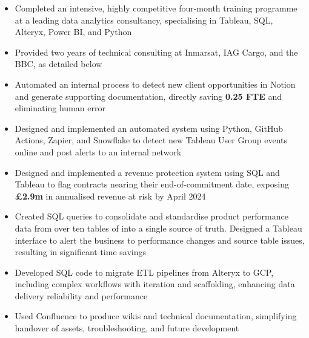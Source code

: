 \begin{paracol}{2}

\begin{itemize}
\item Completed an intensive, highly competitive four-month training programme at a leading data analytics consultancy, specialising in Tableau, SQL, Alteryx, Power BI, and Python
\item Provided two years of technical consulting at Inmarsat, IAG Cargo, and the BBC, as detailed below
\item Automated an internal process to detect new client opportunities in Notion and generate supporting documentation, directly saving \textbf{0.25 FTE} and eliminating human error
\item Designed and implemented an automated system using Python, GitHub Actions, Zapier, and Snowflake to detect new Tableau User Group events online and post alerts to an internal network

\medskip
{}

\end{itemize}

\divider


\begin{itemize}
\item Designed and implemented a revenue protection system using SQL and Tableau to flag contracts nearing their end-of-commitment date, exposing \textbf{£2.9m} in annualised revenue at risk by April 2024
\item Created SQL queries to consolidate and standardise product performance data from over ten tables of into a single source of truth. Designed a Tableau interface to alert the business to performance changes and source table issues, resulting in significant time savings
\item Developed SQL code to migrate ETL pipelines from Alteryx to GCP, including complex workflows with iteration and scaffolding, enhancing data delivery reliability and performance
\item Used Confluence to produce wikis and technical documentation, simplifying handover of assets, troubleshooting, and future development


\end{itemize}
\end{paracol}
